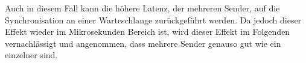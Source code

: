 Auch in diesem Fall kann die höhere Latenz, der mehreren Sender, auf die Synchronisation an einer Warteschlange zurückgeführt werden. Da jedoch dieser Effekt wieder im Mikrosekunden Bereich ist, wird dieser Effekt im Folgenden vernachlässigt und angenommen, dass mehrere Sender genauso gut wie ein einzelner sind. 




